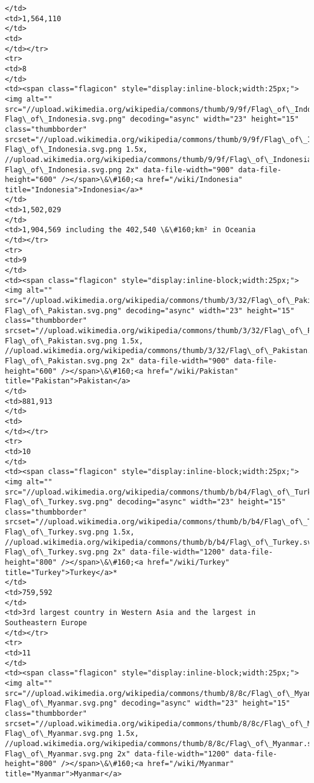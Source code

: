 \documentclass[11pt]{article}
\begin{document}
\begin{Verbatim}[commandchars=\\\{\}]
</td>
<td>1,564,110
</td>
<td>
</td></tr>
<tr>
<td>8
</td>
<td><span class="flagicon" style="display:inline-block;width:25px;"><img alt="" src="//upload.wikimedia.org/wikipedia/commons/thumb/9/9f/Flag\_of\_Indonesia.svg/23px-Flag\_of\_Indonesia.svg.png" decoding="async" width="23" height="15" class="thumbborder" srcset="//upload.wikimedia.org/wikipedia/commons/thumb/9/9f/Flag\_of\_Indonesia.svg/35px-Flag\_of\_Indonesia.svg.png 1.5x, //upload.wikimedia.org/wikipedia/commons/thumb/9/9f/Flag\_of\_Indonesia.svg/45px-Flag\_of\_Indonesia.svg.png 2x" data-file-width="900" data-file-height="600" /></span>\&\#160;<a href="/wiki/Indonesia" title="Indonesia">Indonesia</a>*
</td>
<td>1,502,029
</td>
<td>1,904,569 including the 402,540 \&\#160;km² in Oceania
</td></tr>
<tr>
<td>9
</td>
<td><span class="flagicon" style="display:inline-block;width:25px;"><img alt="" src="//upload.wikimedia.org/wikipedia/commons/thumb/3/32/Flag\_of\_Pakistan.svg/23px-Flag\_of\_Pakistan.svg.png" decoding="async" width="23" height="15" class="thumbborder" srcset="//upload.wikimedia.org/wikipedia/commons/thumb/3/32/Flag\_of\_Pakistan.svg/35px-Flag\_of\_Pakistan.svg.png 1.5x, //upload.wikimedia.org/wikipedia/commons/thumb/3/32/Flag\_of\_Pakistan.svg/45px-Flag\_of\_Pakistan.svg.png 2x" data-file-width="900" data-file-height="600" /></span>\&\#160;<a href="/wiki/Pakistan" title="Pakistan">Pakistan</a>
</td>
<td>881,913
</td>
<td>
</td></tr>
<tr>
<td>10
</td>
<td><span class="flagicon" style="display:inline-block;width:25px;"><img alt="" src="//upload.wikimedia.org/wikipedia/commons/thumb/b/b4/Flag\_of\_Turkey.svg/23px-Flag\_of\_Turkey.svg.png" decoding="async" width="23" height="15" class="thumbborder" srcset="//upload.wikimedia.org/wikipedia/commons/thumb/b/b4/Flag\_of\_Turkey.svg/35px-Flag\_of\_Turkey.svg.png 1.5x, //upload.wikimedia.org/wikipedia/commons/thumb/b/b4/Flag\_of\_Turkey.svg/45px-Flag\_of\_Turkey.svg.png 2x" data-file-width="1200" data-file-height="800" /></span>\&\#160;<a href="/wiki/Turkey" title="Turkey">Turkey</a>*
</td>
<td>759,592
</td>
<td>3rd largest country in Western Asia and the largest in Southeastern Europe
</td></tr>
<tr>
<td>11
</td>
<td><span class="flagicon" style="display:inline-block;width:25px;"><img alt="" src="//upload.wikimedia.org/wikipedia/commons/thumb/8/8c/Flag\_of\_Myanmar.svg/23px-Flag\_of\_Myanmar.svg.png" decoding="async" width="23" height="15" class="thumbborder" srcset="//upload.wikimedia.org/wikipedia/commons/thumb/8/8c/Flag\_of\_Myanmar.svg/35px-Flag\_of\_Myanmar.svg.png 1.5x, //upload.wikimedia.org/wikipedia/commons/thumb/8/8c/Flag\_of\_Myanmar.svg/45px-Flag\_of\_Myanmar.svg.png 2x" data-file-width="1200" data-file-height="800" /></span>\&\#160;<a href="/wiki/Myanmar" title="Myanmar">Myanmar</a>

\end{Verbatim}
\end{document}
